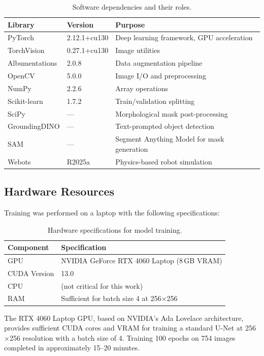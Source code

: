 \documentclass[12pt,a4paper]{article}
\begin{document}
\begin{table}[H]
\centering
\caption{Software dependencies and their roles.}
\label{tab:software}
\begin{tabular}{@{}lll@{}}
\toprule
\textbf{Library} & \textbf{Version} & \textbf{Purpose} \\
\midrule
PyTorch & 2.12.1+cu130 & Deep learning framework, GPU acceleration \\
TorchVision & 0.27.1+cu130 & Image utilities \\
Albumentations & 2.0.8 & Data augmentation pipeline \\
OpenCV & 5.0.0 & Image I/O and preprocessing \\
NumPy & 2.2.6 & Array operations \\
Scikit-learn & 1.7.2 & Train/validation splitting \\
SciPy & --- & Morphological mask post-processing \\
GroundingDINO & --- & Text-prompted object detection \\
SAM & --- & Segment Anything Model for mask generation \\
Webots & R2025a & Physics-based robot simulation \\
\bottomrule
\end{tabular}
\end{table}

\subsection{Hardware Resources}

Training was performed on a laptop with the following specifications:

\begin{table}[H]
\centering
\caption{Hardware specifications for model training.}
\label{tab:hardware}
\begin{tabular}{@{}ll@{}}
\toprule
\textbf{Component} & \textbf{Specification} \\
\midrule
GPU & NVIDIA GeForce RTX 4060 Laptop (8\,GB VRAM) \\
CUDA Version & 13.0 \\
CPU & (not critical for this work) \\
RAM & Sufficient for batch size 4 at 256$\times$256 \\
\bottomrule
\end{tabular}
\end{table}

The RTX 4060 Laptop GPU, based on NVIDIA's Ada Lovelace architecture, provides sufficient CUDA cores and VRAM for training a standard U-Net at 256$\times$256 resolution with a batch size of 4. Training 100 epochs on 754 images completed in approximately 15--20 minutes.
\end{document}
